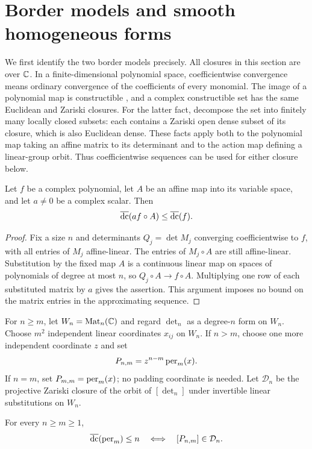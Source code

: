 \section{Border models and smooth homogeneous forms}
\label{sec:models}

We first identify the two border models precisely. All closures in this
section are over $\mathbb C$. In a finite-dimensional polynomial space, coefficientwise
convergence means ordinary convergence of the coefficients of every monomial.
The image of a polynomial map is constructible
\cite[Theorem~29.23.3, Tag~054K]{StacksProject}, and a complex constructible
set has the same Euclidean and Zariski closures. For the latter fact, decompose
the set into finitely many locally closed subsets: each contains a Zariski
open dense subset of its closure, which is also Euclidean dense. These facts
apply both to the polynomial map taking an affine matrix to its determinant
and to the action map defining a linear-group orbit. Thus coefficientwise
sequences can be used for either closure below.

\begin{lemma}
\label{lem:affine-substitution}
Let $f$ be a complex polynomial, let $A$ be an affine map into its variable
space, and let $a\ne0$ be a complex scalar. Then
\[
 \operatorname{\overline{dc}}(a f\circ A)\le \operatorname{\overline{dc}}(f).
\]
\end{lemma}
\begin{proof}
Fix a size $n$ and determinants $Q_j=\det M_j$ converging coefficientwise to
$f$, with all entries of $M_j$ affine-linear. The entries of $M_j\circ A$
are still affine-linear. Substitution by the fixed map $A$ is a continuous
linear map on spaces of polynomials of degree at most $n$, so
$Q_j\circ A\to f\circ A$. Multiplying one row of each substituted matrix
by $a$ gives the assertion. This argument imposes no bound on the matrix
entries in the approximating sequence.
\end{proof}

For $n\ge m$, let $W_n=\operatorname{Mat}_n(\mathbb C)$ and regard $\det_n$ as a degree-$n$
form on $W_n$. Choose $m^2$ independent linear coordinates $x_{ij}$ on $W_n$.
If $n>m$, choose one more independent coordinate $z$ and set
\[
 P_{n,m}=z^{n-m}\operatorname{per}_m(x).
\]
If $n=m$, set $P_{m,m}=\operatorname{per}_m(x)$; no padding coordinate is needed.
Let $\mathcal D_n$ be the projective Zariski closure of the orbit of
$[\det_n]$ under invertible linear substitutions on $W_n$.

\begin{proposition}
\label{prop:model-equivalence}
For every $n\ge m\ge1$,
\[
 \operatorname{\overline{dc}}(\operatorname{per}_m)\le n
 \quad\Longleftrightarrow\quad
 [P_{n,m}]\in\mathcal D_n.
\]
\end{proposition}

